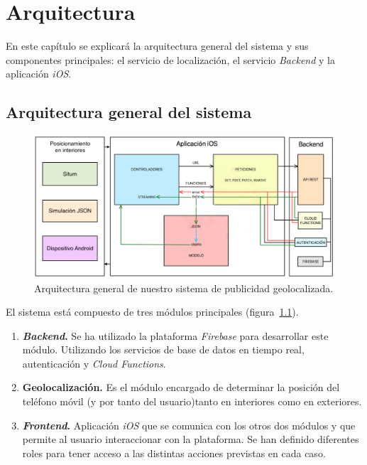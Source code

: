 \chapter{Arquitectura}\label{diseno}
En este capítulo se explicará la arquitectura general del sistema y sus componentes principales: el servicio de localización, el servicio \textit{Backend} y la aplicación \textit{iOS}.

\section{Arquitectura general del sistema}

\begin{figure}[tbp]
\centering
\includegraphics[width=\textwidth]{figures/arquitectura.png}
\caption{Arquitectura general de nuestro sistema de publicidad geolocalizada.\label{fig:arquitectura_2}}
\end{figure}

El sistema está compuesto de tres módulos principales (figura~\ref{fig:arquitectura_2}).
\begin{enumerate}
\item \textbf{\textit{Backend}.} Se ha utilizado la plataforma \textit{Firebase} para desarrollar este módulo. Utilizando los servicios de base de datos en tiempo real, autenticación y \textit{Cloud Functions}.

\item \textbf{Geolocalización.} Es el módulo encargado de determinar la posición del teléfono móvil (y por tanto del usuario)tanto en interiores como en exteriores.

\item \textbf{\textit{Frontend}.} Aplicación \textit{iOS} que se comunica con los otros dos módulos y que permite al usuario interaccionar con la plataforma. 
Se han definido diferentes roles para tener acceso a las distintas acciones previstas en cada caso.
\end{enumerate}


